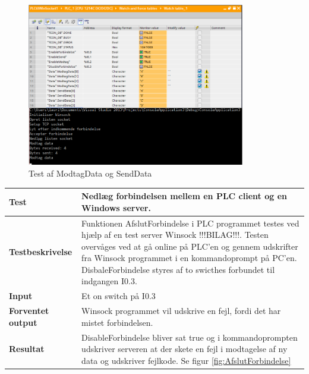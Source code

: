 \begin{figure}[H] %
	\centering
	\includegraphics[width=0.85\textwidth]{Test/ModultestStyringsenhed/ModtagDataOgSendData}
	\caption{Test af ModtagData og SendData}
	\label{fig:ModtagDataOgSendData}
\end{figure}

\begin{center}
	\begin{tabular}{ | m{} | m{}|} 
		\hline
		\textbf{Test}					&Nedlæg forbindelsen mellem en PLC client og en Windows server.\\ \hline
		\textbf{Testbeskrivelse}		&Funktionen AfslutForbindelse i PLC programmet testes ved hjælp af en test server Winsock !!!BILAG!!!. Testen overvåges ved at gå online på PLC'en og gennem udskrifter fra Winsock programmet i en kommandoprompt på PC'en. DisbaleForbindelse styres af to swicthes forbundet til indgangen I0.3. \\ \hline
		\textbf{Input}					& Et on switch på I0.3\\ \hline
		\textbf{Forventet output}		&Winsock programmet vil udskrive en fejl, fordi det har mistet forbindelsen. \\ \hline
		\textbf{Resultat}				&DisableForbindelse bliver sat true og i kommandoprompten udskriver serveren at der skete en fejl i modtagelse af ny data og udskriver fejlkode. Se figur \ref{fig:AfslutForbindelse} \\ \hline
	\end{tabular}
\end{center}

